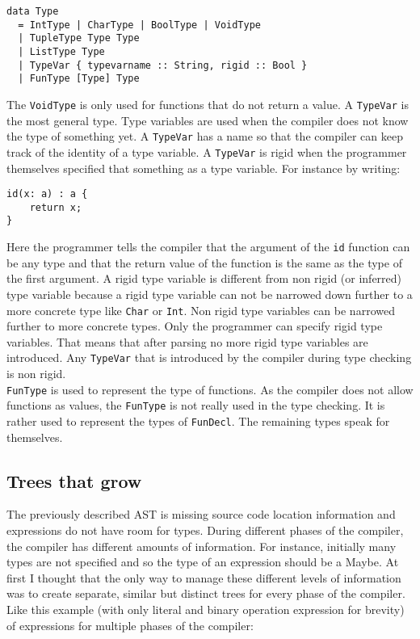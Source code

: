 \documentclass{report}
\begin{document}
\begin{verbatim}
data Type
  = IntType | CharType | BoolType | VoidType
  | TupleType Type Type
  | ListType Type
  | TypeVar { typevarname :: String, rigid :: Bool }
  | FunType [Type] Type 
\end{verbatim}
The \texttt{VoidType} is only used for functions that do not return a value. 
A \texttt{TypeVar} is the most general type. Type variables are used when the compiler does not know the type of something yet. A \texttt{TypeVar} has a name so that the compiler can keep track of the identity of a type variable. A \texttt{TypeVar} is rigid when the programmer themselves specified that something as a type variable. For instance by writing: \begin{lstlisting}[style=SPL]
id(x: a) : a { 
    return x;
}
\end{lstlisting} 
Here the programmer tells the compiler that the argument of the \texttt{id} function can be any type and that the return value of the function is the same as the type of the first argument. A rigid type variable is different from non rigid (or inferred) type variable because a rigid type variable can not be narrowed down further to a more concrete type like \texttt{Char} or \texttt{Int}. Non rigid type variables can be narrowed further to more concrete types. Only the programmer can specify rigid type variables. That means that after parsing no more rigid type variables are introduced. Any \texttt{TypeVar} that is introduced by the compiler during type checking is non rigid. 
\\
\texttt{FunType} is used to represent the type of functions. As the compiler does not allow functions as values, the \texttt{FunType} is not really used in the type checking. It is rather used to represent the types of \texttt{FunDecl}. The remaining types speak for themselves.

\subsection{Trees that grow}

The previously described AST is missing source code location information and expressions do not have room for types. During different phases of the compiler, the compiler has different amounts of information. For instance, initially many types are not specified and so the type of an expression should be a Maybe. At first I thought that the only way to manage these different levels of information was to create separate, similar but distinct trees for every phase of the compiler. Like this example (with only literal and binary operation expression for brevity) of expressions for multiple phases of the compiler:
\end{document}
